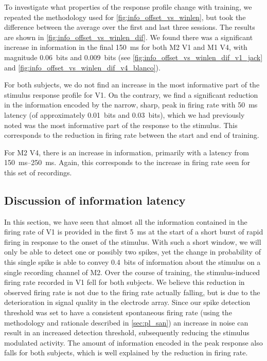 To investigate what properties of the response profile change with training, we repeated the methodology used for \autoref{fig:info_offset_vs_winlen}, but took the difference between the average over the first and last three sessions.
The results are shown in \autoref{fig:info_offset_vs_winlen_dif}.
We found there was a significant increase in information in the final \SI{150}{\milli\second} for both \ac{M2} \ac{V1} and \ac{M1} \ac{V4}, with magnitude \SI{0.06}{bits} and \SI{0.009}{bits} (see \autoref{fig:info_offset_vs_winlen_dif_v1_jack} and \autoref{fig:info_offset_vs_winlen_dif_v4_blanco}).

For both subjects, we do not find an increase in the most informative part of the stimulus response profile for \ac{V1}.
On the contrary, we find a significant reduction in the information encoded by the narrow, sharp, peak in firing rate with \SI{50}{\milli\second} latency (of approximately \SI{0.01}{bits} and \SI{0.03}{bits}), which we had previously noted was the most informative part of the response to the stimulus.
This corresponds to the reduction in firing rate between the start and end of training.

For \ac{M2} \ac{V4}, there is an increase in information, primarily with a latency from \SIrange{150}{250}{\milli\second}.
Again, this corresponds to the increase in firing rate seen for this set of recordings.


\subsection{Discussion of information latency}

In this section, we have seen that almost all the information contained in the firing rate of \ac{V1} is provided in the first \SI{5}{\milli\second} at the start of a short burst of rapid firing in response to the onset of the stimulus.
With such a short window, we will only be able to detect one or possibly two spikes, yet the change in probability of this single spike is able to convey \SI{0.4}{bits} of information about the stimulus on a single recording channel of \ac{M2}.
Over the course of training, the stimulus-induced firing rate recorded in \ac{V1} fell for both subjects.
We believe this reduction in observed firing rate is not due to the firing rate actually falling, but is due to the deterioration in signal quality in the electrode array.
Since our spike detection threshold was set to have a consistent spontaneous firing rate (using the methodology and rationale described in \autoref{sec:pl_san}) an increase in noise can result in an increased detection threshold, subsequently reducing the stimulus modulated activity.
The amount of information encoded in the peak response also falls for both subjects, which is well explained by the reduction in firing rate.


